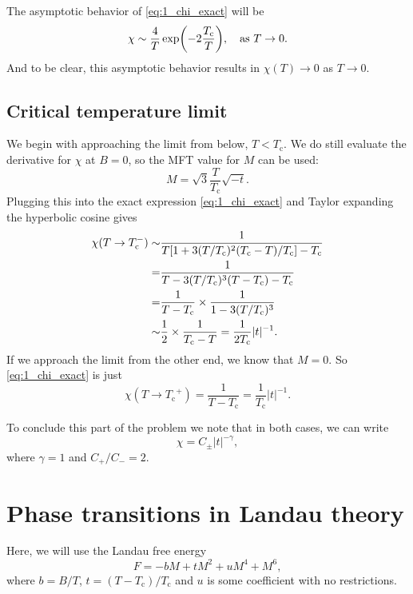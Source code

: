 \documentclass[11pt,letter, swedish, english
]{article}
\newcommand{\Tc}{\ensuremath{T_{\text{c}}}}
\begin{document}
The asymptotic behavior of \eqref{eq:1_chi_exact} will be 
\begin{equation}
\chi\sim \frac{4}{T}\exp(-2\frac{\Tc}{T})
\qcomma \text{as}\ T\to0.
\end{equation}
And to be clear, this asymptotic behavior results in $\chi(T)\to0$ as
$T\to0$. 


\subsection{Critical temperature limit}
We begin with approaching the limit from below, $T<\Tc$. We do still
evaluate the derivative for $\chi$ at $B=0$, so the MFT value for $M$
can be used:
\begin{equation}
M=\sqrt{3}\frac{T}{\Tc}\sqrt{-t}.
\end{equation}
Plugging this into the exact expression \eqref{eq:1_chi_exact} and
Taylor expanding the hyperbolic cosine gives
\begin{equation}
\begin{aligned}
\chi(T\to\Tc^-)\sim&\frac{1}{T\qty[1+3(T/\Tc)^2(\Tc-T)/\Tc]-\Tc}\\
=&\frac{1}{T-3(T/\Tc)^3(T-\Tc) -\Tc}\\
=&\frac{1}{T-\Tc}\times\frac{1}{1-3(T/\Tc)^3}\\
\sim&\frac{1}{2}\times\frac{1}{\Tc-T}=\frac{1}{2\Tc}|t|^{-1}.
\end{aligned}
\end{equation}
If we approach the limit from the other end, we know that $M=0$. So
\eqref{eq:1_chi_exact} is just
\begin{equation}
\chi(T\to\Tc^+)=\frac{1}{T-\Tc}=\frac{1}{\Tc} |t|^{-1}.
\end{equation}

To conclude this part of the problem we note that in both cases, we
can write
\begin{equation}
\chi=C_\pm |t|^{-\gamma},
\end{equation}
where $\gamma=1$ and $C_+/C_-=2$.



\section{Phase transitions in Landau theory}
\renewcommand{\thesubsection}{\arabic{section} (\alph{subsection})}
\renewcommand{\thesubsubsection}{\arabic{section} (\alph{subsection},\,\roman{subsubsection})}

Here, we will use the Landau free energy
\begin{equation}\label{eq:2_F(M)}
F=-bM+tM^2+uM^4+M^6,
\end{equation}
where $b=B/T$, $t=(T-\Tc)/\Tc$ and $u$ is some coefficient with no
restrictions. 
\end{document}
